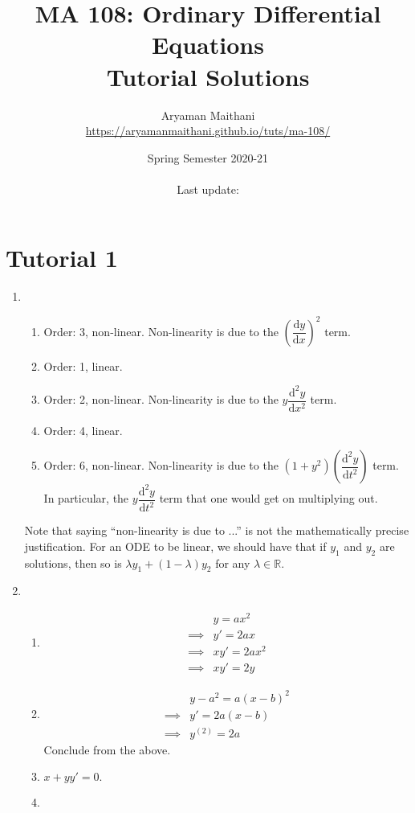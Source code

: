 \documentclass[12pt]{article}
\title{MA 108: Ordinary Differential Equations\\\large{Tutorial Solutions}}
\author{Aryaman Maithani\\\url{https://aryamanmaithani.github.io/tuts/ma-108/}}
\date{Spring Semester 2020-21\\~\\Last update: \DTMnow}
\theoremstyle{definition}
\numberwithin{thm}{section}
\newcommand{\dd}{{\mathrm d}}
\begin{document}
\maketitle
\tableofcontents

\newpage\section{Tutorial 1}
\begin{enumerate}[leftmargin=*, label = Q.\arabic*.] 
	\item 
	\begin{enumerate}[label = (\roman*)] 
		\item Order: 3, non-linear. Non-linearity is due to the $\left(\dfrac{\dd y}{\dd x}\right)^2$ term.
		\item Order: 1, linear.
		\item Order: 2, non-linear. Non-linearity is due to the $y\dfrac{\dd^2y}{\dd x^2}$ term.
		\item Order: 4, linear.
		\item Order: 6, non-linear. Non-linearity is due to the $(1 + y^2)\left(\dfrac{\dd^2y}{\dd t^2}\right)$ term. In particular, the $y\dfrac{\dd^2y}{\dd t^2}$ term that one would get on multiplying out.
	\end{enumerate}
	Note that saying ``non-linearity is due to ...'' is not the mathematically precise justification. For an ODE to be linear, we should have that if $y_1$ and $y_2$ are solutions, then so is $\lambda y_1 + (1 - \lambda)y_2$ for any $\lambda \in \mathbb{R}.$
	\item \begin{enumerate}[label = (\roman*)] 
		\item \begin{align*} 
			& y = ax^2\\
			\implies & y' = 2ax\\
			\implies & xy' = 2ax^2\\
			\implies & xy' = 2y
		\end{align*}
		\item \begin{align*} 
			& y - a^2 = a(x - b)^2\\
			\implies & y' = 2a(x - b)\\
			\implies & y^{(2)} = 2a
		\end{align*}
		Conclude from the above.
		\item $x + yy' = 0.$
		\item 
		\begin{align} 

\end{align}
\end{enumerate}
\end{enumerate}
\end{document}
